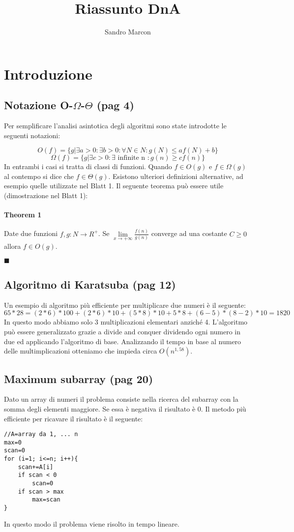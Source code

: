 \documentclass[a4paper]{book}
\author{Sandro Marcon}
\title{Riassunto DnA}
\newenvironment{mytheorem}[1]{\subsubsection*{Theorem #1}}{\begin{flushright}$\blacksquare$\end{flushright}}
\begin{document}
\chapter{Introduzione}
\section{Notazione O-$\Omega$-$\Theta$ (pag 4)}
Per semplificare l'analisi asintotica degli algoritmi sono state introdotte le 
seguenti notazioni:

$$O(f)=\{ g|\exists a>0: \exists b>0: \forall N \in N : g(N)\leq af(N)+b \}$$
$$\Omega (f)=\{ g|\exists c>0: \exists \mbox{ infinite n } : g(n) \geq cf(n) \}$$
In entrambi i casi si tratta di classi di funzioni. Quando $f \in O(g)$ e $f \in \Omega (g)$ al contempo si dice che $f \in \Theta (g)$. Esistono ulteriori definizioni alternative, ad esempio quelle utilizzate nel Blatt 1. Il seguente teorema può essere utile (dimostrazione nel Blatt 1):
\newtheorem{theorem}{Theorem}
\begin{mytheorem}{1}
Date due funzioni $ f,g: N \rightarrow R^{+} $. Se $ \lim\limits_{x \rightarrow +\infty} \frac{f(n)}{g(n)} $ converge ad una costante $C\geq 0$ allora $f \in O(g)$.
\end{mytheorem}
\section{Algoritmo di Karatsuba (pag 12)}
Un esempio di algoritmo più efficiente per multiplicare due numeri è il seguente:
$$65 * 28 = (2 * 6) * 100 + (2 * 6) * 10 + (5 * 8) * 10 + 5 * 8 + (6-5)*(8-2) * 10 = 1820 $$
In questo modo abbiamo solo 3 multiplicazioni elementari anziché 4. L'algoritmo può essere generalizzato grazie a divide and conquer dividendo ogni numero in due ed applicando l'algoritmo di base. Analizzando il tempo in base al numero delle multimplicazioni otteniamo che impieda circa $O(n^{1,58})$.
\section{Maximum subarray (pag 20)}
Dato un array di numeri il problema consiste nella ricerca del subarray con la somma degli elementi maggiore. Se essa è negativa il risultato è 0. Il metodo più efficiente per ricavare il risultato è il seguente:
\begin{lstlisting}
//A=array da 1, ... n	
max=0	
scan=0
for (i=1; i<=n; i++){	
	scan+=A[i]
	if scan < 0
		scan=0
	if scan > max 
		max=scan
}			
\end{lstlisting}
In questo modo il problema viene risolto in tempo lineare.	
\end{document}
